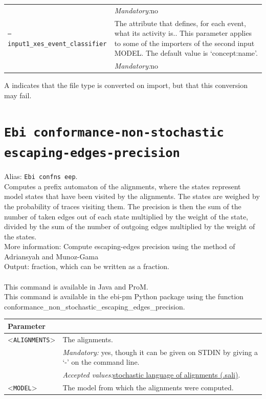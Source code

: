 {\begin{tabularx}{\linewidth}{lX}
&\textit{Mandatory:}\quad no\\
\texttt{--input1\_xes\_event\_classifier} & The attribute that defines, for each event, what its activity is.. This parameter applies to some of the importers of the second input MODEL. The default value is `concept:name'.\\
&\textit{Mandatory:}\quad no\\
\bottomrule
\end{tabularx}
A \textdagger{} indicates that the file type is converted on import, but that this conversion may fail.
\clearpage\section{\texttt{Ebi conformance-non-stochastic escaping-edges-precision}}
\label{command:Ebi conformance-non-stochastic escaping-edges-precision}
Alias: \texttt{Ebi confns eep}.\\
Computes a prefix automaton of the alignments, where the states represent model states that have been visited by the alignments. The states are weighed by the probability of traces visiting them. The precision is then the sum of the number of taken edges out of each state multiplied by the weight of the state, divided by the sum of the number of outgoing edges multiplied by the weight of the states.\\
More information: Compute escaping-edges precision using the method of Adriansyah and Munoz-Gama~\cite{DBLP:conf/bpm/AdriansyahMCDA12}~\\
\noindent Output: fraction, which can be written as a fraction.\\
\\This command is available in Java and ProM.
\\This command is available in the ebi-pm Python package using the function conformance\_non\_stochastic\_escaping\_edges\_precision.
\begin{tabularx}{\linewidth}{lX}
\toprule
Parameter \\\midrule
<\texttt{ALIGNMENTS}>&The alignments.\\
&\textit{Mandatory:} \quad yes, though it can be given on STDIN by giving a `-' on the command line.\\
&\textit{Accepted values:}\quad \hyperref[filehandler:stochastic language of alignments]{stochastic language of alignments (.sali)}.\\
<\texttt{MODEL}>&The model from which the alignments were computed.\\

\end{tabularx}}

